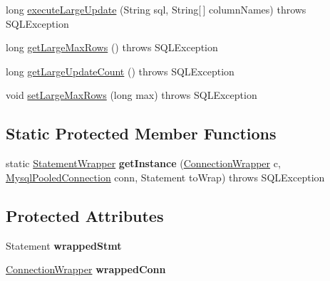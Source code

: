 \begin{DoxyCompactItemize}
\item 
long \mbox{\hyperlink{classcom_1_1mysql_1_1cj_1_1jdbc_1_1_statement_wrapper_a907a6487714ad7ebfa9748941e8536ba}{execute\+Large\+Update}} (String sql, String\mbox{[}$\,$\mbox{]} column\+Names)  throws S\+Q\+L\+Exception 
\item 
long \mbox{\hyperlink{classcom_1_1mysql_1_1cj_1_1jdbc_1_1_statement_wrapper_a278f7751716609f44cbe208f8da4bd4a}{get\+Large\+Max\+Rows}} ()  throws S\+Q\+L\+Exception 
\item 
long \mbox{\hyperlink{classcom_1_1mysql_1_1cj_1_1jdbc_1_1_statement_wrapper_a2d0e35e66a5244ef9218c70d17296a2a}{get\+Large\+Update\+Count}} ()  throws S\+Q\+L\+Exception 
\item 
void \mbox{\hyperlink{classcom_1_1mysql_1_1cj_1_1jdbc_1_1_statement_wrapper_ab2e820896ea1e4ae65f5151dfca8af5f}{set\+Large\+Max\+Rows}} (long max)  throws S\+Q\+L\+Exception 
\end{DoxyCompactItemize}
\subsection*{Static Protected Member Functions}
\begin{DoxyCompactItemize}
\item 
\mbox{\label{classcom_1_1mysql_1_1cj_1_1jdbc_1_1_statement_wrapper_a27bd31a020b0037551230fd0c451fe4a}} 
static \mbox{\hyperlink{classcom_1_1mysql_1_1cj_1_1jdbc_1_1_statement_wrapper}{Statement\+Wrapper}} {\bfseries get\+Instance} (\mbox{\hyperlink{classcom_1_1mysql_1_1cj_1_1jdbc_1_1_connection_wrapper}{Connection\+Wrapper}} c, \mbox{\hyperlink{classcom_1_1mysql_1_1cj_1_1jdbc_1_1_mysql_pooled_connection}{Mysql\+Pooled\+Connection}} conn, Statement to\+Wrap)  throws S\+Q\+L\+Exception 
\end{DoxyCompactItemize}
\subsection*{Protected Attributes}
\begin{DoxyCompactItemize}
\item 
\mbox{\label{classcom_1_1mysql_1_1cj_1_1jdbc_1_1_statement_wrapper_a237cb10a8c5fbde91ad58f91d4448504}} 
Statement {\bfseries wrapped\+Stmt}
\item 
\mbox{\label{classcom_1_1mysql_1_1cj_1_1jdbc_1_1_statement_wrapper_aa24a3511780470aabd51d2a769217c21}} 
\mbox{\hyperlink{classcom_1_1mysql_1_1cj_1_1jdbc_1_1_connection_wrapper}{Connection\+Wrapper}} {\bfseries wrapped\+Conn}
\end{DoxyCompactItemize}


